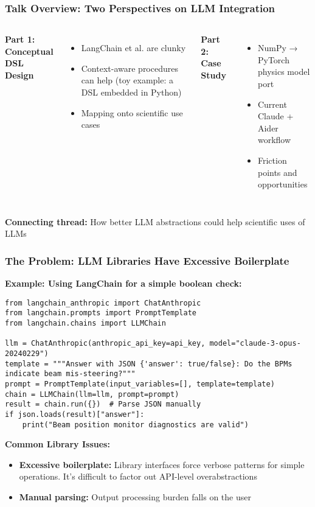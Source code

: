 \documentclass{beamer}
\title{}
\subtitle{}
\author{}
\date{\today}
\begin{document}
\begin{frame}
\titlepage
\end{frame}

\begin{frame}
\frametitle{Talk Overview: Two Perspectives on LLM Integration}

\begin{columns}
\textbf{Part 1: Conceptual DSL Design}
\begin{itemize}
\item LangChain et al. are clunky
\item Context-aware procedures can help (toy example: a DSL embedded in Python)
\item Mapping onto scientific use cases
\end{itemize}

\textbf{Part 2: Case Study}
\begin{itemize}
\item NumPy → PyTorch physics model port
\item Current Claude + Aider workflow
\item Friction points and opportunities
\end{itemize}
\end{columns}

\vspace{0.5cm}
\centering
\textbf{Connecting thread:} How better LLM abstractions could help scientific uses of LLMs
\end{frame}

\begin{frame}[fragile]
\frametitle{The Problem: LLM Libraries Have Excessive Boilerplate}

\textbf{Example: Using LangChain for a simple boolean check:}
\begin{lstlisting}[basicstyle=\ttfamily\scriptsize]
from langchain_anthropic import ChatAnthropic
from langchain.prompts import PromptTemplate
from langchain.chains import LLMChain

llm = ChatAnthropic(anthropic_api_key=api_key, model="claude-3-opus-20240229")
template = """Answer with JSON {'answer': true/false}: Do the BPMs indicate beam mis-steering?"""
prompt = PromptTemplate(input_variables=[], template=template)
chain = LLMChain(llm=llm, prompt=prompt)
result = chain.run({})  # Parse JSON manually
if json.loads(result)["answer"]:
    print("Beam position monitor diagnostics are valid")
\end{lstlisting}

\textbf{Common Library Issues:}
\begin{itemize}
\item \textbf{Excessive boilerplate:} Library interfaces force verbose patterns for simple operations. It's difficult to factor out API-level overabstractions
\item \textbf{Manual parsing:} Output processing burden falls on the user
\end{itemize}
\end{frame}
\end{document}
